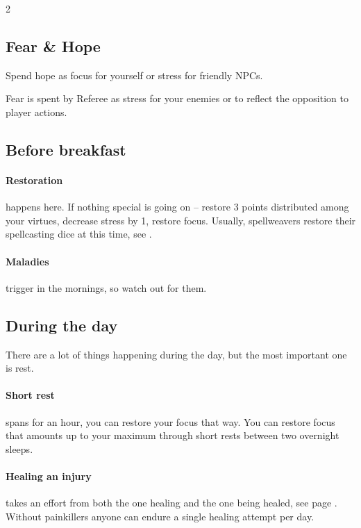 \begin{multicols*}{2}

\subsection*{Fear \& Hope}

Spend hope as focus for yourself or stress for friendly NPCs. 

Fear is spent by Referee as stress for your enemies or to reflect the opposition to player actions.

\newcolumn

\subsection*{Before breakfast}

\paragraph{Restoration} happens here. 
If nothing special is going on -- restore 3 points distributed among your virtues, decrease stress by 1, restore focus. 
Usually, spellweavers restore their spellcasting dice at this time, see \pageref*{sec:spellweaving}.

\paragraph{Maladies} trigger in the mornings, so watch out for them.

\subsection*{During the day} 

There are a lot of things happening during the day, but the most important one is rest. 

\paragraph{Short rest} spans for an hour, you can restore your focus that way. 
You can restore focus that amounts up to your maximum through short rests between two overnight sleeps.

\paragraph{Healing an injury} takes an effort from both the one healing and the one being healed, see page \pageref*{sec:healing}. 
Without painkillers anyone can endure a single healing attempt per day.


\end{multicols*}

